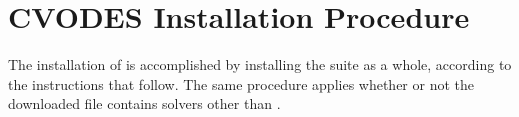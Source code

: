 \chapter{CVODES Installation Procedure}\label{s:install}

The installation of {\cvodes} is accomplished by installing the
{\sundials} suite as a whole, according to the instructions that
follow.   The same procedure applies whether or not the downloaded
file contains solvers other than {\cvodes}.


